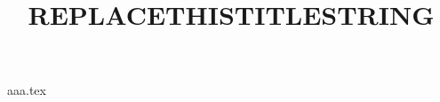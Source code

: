 \documentclass[10pt]{article}
\title{REPLACETHISTITLESTRING}
\begin{document}
\maketitle
{aaa.tex}
\end{document}
